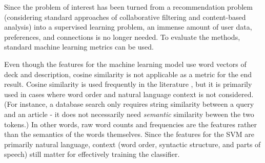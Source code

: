 \documentclass[10pt,twocolumn]{article}
\begin{document}
\begin{comment}
    
    P. Sujatha and K. Mahalakshmi - cited

    "Decision Tree, Naïve
Bayes, Random Forest, Support Vector Machine, K-Nearest
Neighbor and logistic Regression algorithms. The performance
of the algorithms was analyzed using parameters such as
Accuracy, Precision, AUC and F1-score"

    "From the
experimental result, it is found that the Random Forest is more
accurate for predicting the heart disease with accuracy of
83.52%
algorithms. The F1- Score, AUC and precision score of
Random forest classifiers are 84.21%
respectively."
    
    Performance Evaluation of Supervised Machine
Learning Algorithms in Prediction of Heart Disease
    https://ieeexplore.ieee.org/stamp/stamp.jsp?arnumber=9298354
    
    
    - Standard ML metrics 
        Precision
        recall
        F-1 score
        Confusion matrix visualization


    Minimum viable product - pipeline is explainable and performance outperforms random guessing. (Given a class balance, random guessing is right 50%

    More time and resources - pipeline is explainable and performance outperforms random guessing w/ agreement from several testcase suites and human volunteers

    Best case scenario: pipeline is explainable and performance outperforms random guessing w/ agreement from several testcase suites and human volunteers, and NLP approaches would be validated by human volunteers
    
\end{comment}

Since the problem of interest has been turned from a recommendation problem (considering standard approaches of collaborative filtering and content-based analysis) into a supervised learning problem, an immense amount of user data, preferences, and connections is no longer needed. To evaluate the methods, standard machine learning metrics can be used.

Even though the features for the machine learning model use word vectors of deck and description, cosine similarity is not applicable as a metric for the end result. Cosine similarity is used frequently in the literature \cite{Ferdaous, Ryan_47, STata}, but it is primarily used in cases where word order and natural language context is not considered. (For instance, a database search only requires string similarity between a query and an article - it does not necessarily need \textit{semantic} similarity beween the two tokens.) In other words, raw word counts and frequencies are the features rather than the semantics of the words themselves. Since the features for the SVM are primarily natural language, context (word order, syntactic structure, and parts of speech) still matter for effectively training the classifier. 
\end{document}
